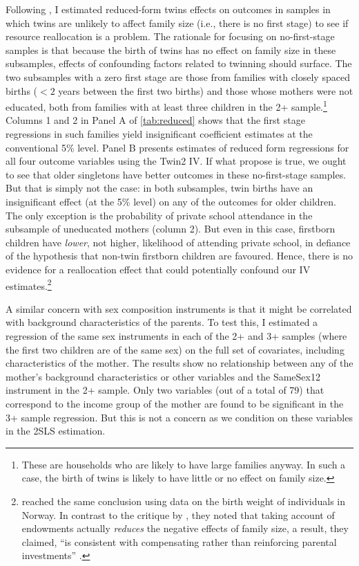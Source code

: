Following \textcite{angrist_multiple_2010}, I estimated reduced-form twins effects on outcomes in samples in which twins are unlikely to affect family size (i.e., there is no first stage) to see if resource reallocation is a problem. The rationale for focusing on no-first-stage samples is that because the birth of twins has no effect on family size in these subsamples, effects of confounding factors related to twinning should surface. The two subsamples with a zero first stage are those from families with closely spaced births ($ <2 $ years between the first two births) and those whose mothers were not educated, both from families with at least three children in the 2+ sample.\footnote{ These are households who are likely to have large families anyway. In such a case, the birth of twins is likely to have little or no effect on family size. }  Columns 1 and 2 in Panel A of \autoref{tab:reduced} shows that the first stage regressions in such families yield insignificant coefficient estimates at the conventional 5\% level. Panel B presents estimates of reduced form regressions for all four outcome variables using the Twin2 IV. If what \textcite{rosenzweig_population_2009} propose is true, we ought to see that older singletons have better outcomes in these no-first-stage samples. But that is simply not the case: in both subsamples, twin births have an insignificant effect (at the 5\% level) on any of the outcomes for older children. The only exception is the probability of private school attendance in the subsample of uneducated mothers (column 2). But even in this case, firstborn children have \textit{lower}, not higher, likelihood of attending private school, in defiance of the hypothesis that non-twin firstborn children are favoured. Hence, there is no evidence for a reallocation effect that could potentially confound our IV estimates.\footnote{ \textcite{Black2010} reached the same conclusion using data on the birth weight of individuals in Norway. In contrast to the critique by \textcite{rosenzweig_population_2009}, they noted that taking account of endowments actually \textit{reduces} the negative effects of family size, a result, they claimed, \enquote{is consistent with compensating rather than reinforcing parental investments} \parencite[p.~35]{Black2010}. } 
  
A similar concern with sex composition instruments is that it might be correlated with background characteristics of the parents. To test this, I estimated a regression of the same sex instruments in each of the 2+ and 3+ samples (where the first two children are of the same sex) on the full set of covariates, including characteristics of the mother. The results show no relationship between any of the mother’s background characteristics or other variables and the SameSex12 instrument in the 2+ sample. Only two variables (out of a total of 79) that correspond to the income group of the mother are found to be significant in the 3+ sample regression. But this is not a concern as we condition on these variables in the 2SLS estimation.

